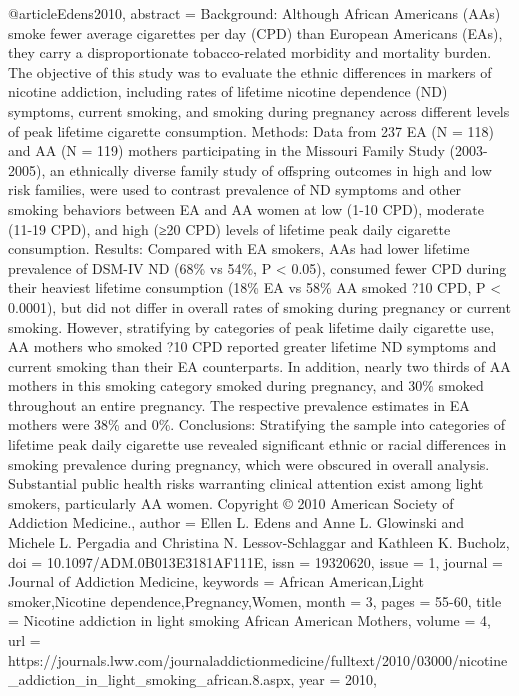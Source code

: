 @article{Edens2010,
   abstract = {Background: Although African Americans (AAs) smoke fewer average cigarettes per day (CPD) than European Americans (EAs), they carry a disproportionate tobacco-related morbidity and mortality burden. The objective of this study was to evaluate the ethnic differences in markers of nicotine addiction, including rates of lifetime nicotine dependence (ND) symptoms, current smoking, and smoking during pregnancy across different levels of peak lifetime cigarette consumption. Methods: Data from 237 EA (N = 118) and AA (N = 119) mothers participating in the Missouri Family Study (2003-2005), an ethnically diverse family study of offspring outcomes in high and low risk families, were used to contrast prevalence of ND symptoms and other smoking behaviors between EA and AA women at low (1-10 CPD), moderate (11-19 CPD), and high (≥20 CPD) levels of lifetime peak daily cigarette consumption. Results: Compared with EA smokers, AAs had lower lifetime prevalence of DSM-IV ND (68\% vs 54\%, P < 0.05), consumed fewer CPD during their heaviest lifetime consumption (18\% EA vs 58\% AA smoked ?10 CPD, P < 0.0001), but did not differ in overall rates of smoking during pregnancy or current smoking. However, stratifying by categories of peak lifetime daily cigarette use, AA mothers who smoked ?10 CPD reported greater lifetime ND symptoms and current smoking than their EA counterparts. In addition, nearly two thirds of AA mothers in this smoking category smoked during pregnancy, and 30\% smoked throughout an entire pregnancy. The respective prevalence estimates in EA mothers were 38\% and 0\%. Conclusions: Stratifying the sample into categories of lifetime peak daily cigarette use revealed significant ethnic or racial differences in smoking prevalence during pregnancy, which were obscured in overall analysis. Substantial public health risks warranting clinical attention exist among light smokers, particularly AA women. Copyright © 2010 American Society of Addiction Medicine.},
   author = {Ellen L. Edens and Anne L. Glowinski and Michele L. Pergadia and Christina N. Lessov-Schlaggar and Kathleen K. Bucholz},
   doi = {10.1097/ADM.0B013E3181AF111E},
   issn = {19320620},
   issue = {1},
   journal = {Journal of Addiction Medicine},
   keywords = {African American,Light smoker,Nicotine dependence,Pregnancy,Women},
   month = {3},
   pages = {55-60},
   title = {Nicotine addiction in light smoking African American Mothers},
   volume = {4},
   url = {https://journals.lww.com/journaladdictionmedicine/fulltext/2010/03000/nicotine_addiction_in_light_smoking_african.8.aspx},
   year = {2010},
}
